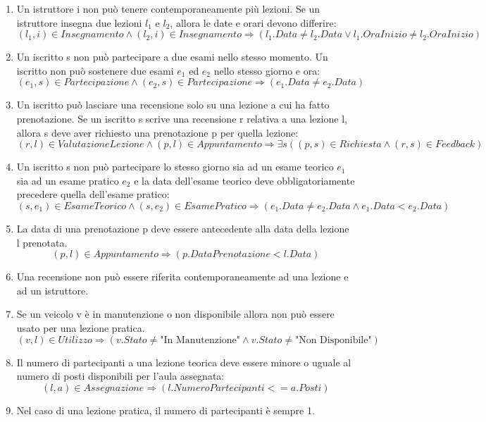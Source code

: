 \documentclass[10pt,twoside]{article}
\begin{document}
{    \begin{enumerate}
        \item Un istruttore i non può tenere contemporaneamente più lezioni. Se un istruttore insegna due lezioni $l_1$ e $l_2$, allora le date e orari devono differire:
        \vspace{-.1cm}
        \[(l_1,i)\in Insegnamento\land (l_2 ,i)\in Insegnamento\Rightarrow(l_1.Data\neq l_2.Data \lor l_1.OraInizio \neq l_2.OraInizio)\]
        \item Un iscritto s non può partecipare a due esami nello stesso momento. Un iscritto non può sostenere due esami $e_1$ ed $e_2$ nello stesso giorno e ora:
        \vspace{-.1cm}
        \[(e_1,s)\in Partecipazione\land (e_2,s)\in Partecipazione\Rightarrow(e_1.Data\neq e_2.Data)\]
        \item Un iscritto può lasciare una recensione solo su una lezione a cui ha fatto prenotazione. Se un iscritto s scrive una recensione r relativa a una lezione l, allora s deve aver richiesto una prenotazione p per quella lezione:
        \vspace{-.1cm}
        \[(r,l)\in ValutazioneLezione \land (p,l)\in Appuntamento\Rightarrow \exists s((p,s)\in Richiesta\land (r,s)\in Feedback)\]
        \item Un iscritto s non può partecipare lo stesso giorno sia ad un esame teorico $e_1$ sia ad un esame pratico $e_2$ e la data dell'esame teorico deve obbligatoriamente precedere quella dell'esame pratico:
        \vspace{-.1cm}
        \[(s,e_1)\in EsameTeorico \land (s,e_2)\in EsamePratico\Rightarrow (e_1.Data\neq e_2.Data \land e_1.Data < e_2.Data)\]
        \item La data di una prenotazione p deve essere antecedente alla data della lezione l prenotata.
        \vspace{-.1cm}
        \[(p,l)\in Appuntamento \Rightarrow (p.DataPrenotazione < l.Data)\]
        \item Una recensione non può essere riferita contemporaneamente ad una lezione e ad un istruttore. 
        \item Se un veicolo v è in manutenzione o non disponibile allora non può essere usato per una lezione pratica.
        \[(v,l)\in Utilizzo \Rightarrow (v.Stato \neq \text{"In Manutenzione"} \land v.Stato \neq \text{"Non Disponibile"})\] 
        \item Il numero di partecipanti a una lezione teorica deve essere minore o uguale al numero di posti disponibili per l'aula assegnata:
        \[(l,a)\in Assegnazione \Rightarrow (l.NumeroPartecipanti <= a.Posti)\]
        \item Nel caso di una lezione pratica, il numero di partecipanti è sempre 1.
    \end{enumerate}

}
\end{document}
